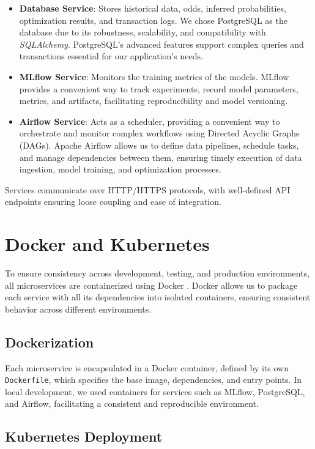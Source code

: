 \begin{itemize}
    \item \textbf{Database Service}: Stores historical data, odds, inferred probabilities, optimization results, and transaction logs. We chose PostgreSQL as the database due to its robustness, scalability, and compatibility with \textit{SQLAlchemy}. PostgreSQL's advanced features support complex queries and transactions essential for our application's needs.

    \item \textbf{MLflow Service}: Monitors the training metrics of the models. MLflow provides a convenient way to track experiments, record model parameters, metrics, and artifacts, facilitating reproducibility and model versioning.

    \item \textbf{Airflow Service}: Acts as a scheduler, providing a convenient way to orchestrate and monitor complex workflows using Directed Acyclic Graphs (DAGs). Apache Airflow allows us to define data pipelines, schedule tasks, and manage dependencies between them, ensuring timely execution of data ingestion, model training, and optimization processes.
\end{itemize}

Services communicate over HTTP/HTTPS protocols, with well-defined API endpoints ensuring loose coupling and ease of integration.

\section{Docker and Kubernetes}

To ensure consistency across development, testing, and production environments, all microservices are containerized using Docker \cite{Merkel2014}. Docker allows us to package each service with all its dependencies into isolated containers, ensuring consistent behavior across different environments.

\subsection{Dockerization}

Each microservice is encapsulated in a Docker container, defined by its own \texttt{Dockerfile}, which specifies the base image, dependencies, and entry points. In local development, we used containers for services such as MLflow, PostgreSQL, and Airflow, facilitating a consistent and reproducible environment.

\subsection{Kubernetes Deployment}

